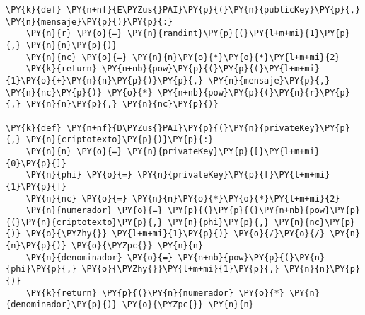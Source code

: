 
\begin{Verbatim}[commandchars=\\\{\}]
\PY{k}{def} \PY{n+nf}{E\PYZus{}PAI}\PY{p}{(}\PY{n}{publicKey}\PY{p}{,} \PY{n}{mensaje}\PY{p}{)}\PY{p}{:} 
    \PY{n}{r} \PY{o}{=} \PY{n}{randint}\PY{p}{(}\PY{l+m+mi}{1}\PY{p}{,} \PY{n}{n}\PY{p}{)} 
    \PY{n}{nc} \PY{o}{=} \PY{n}{n}\PY{o}{*}\PY{o}{*}\PY{l+m+mi}{2}
    \PY{k}{return} \PY{n+nb}{pow}\PY{p}{(}\PY{p}{(}\PY{l+m+mi}{1}\PY{o}{+}\PY{n}{n}\PY{p}{)}\PY{p}{,} \PY{n}{mensaje}\PY{p}{,} \PY{n}{nc}\PY{p}{)} \PY{o}{*} \PY{n+nb}{pow}\PY{p}{(}\PY{n}{r}\PY{p}{,} \PY{n}{n}\PY{p}{,} \PY{n}{nc}\PY{p}{)}

\PY{k}{def} \PY{n+nf}{D\PYZus{}PAI}\PY{p}{(}\PY{n}{privateKey}\PY{p}{,} \PY{n}{criptotexto}\PY{p}{)}\PY{p}{:} 
    \PY{n}{n} \PY{o}{=} \PY{n}{privateKey}\PY{p}{[}\PY{l+m+mi}{0}\PY{p}{]}
    \PY{n}{phi} \PY{o}{=} \PY{n}{privateKey}\PY{p}{[}\PY{l+m+mi}{1}\PY{p}{]}
    \PY{n}{nc} \PY{o}{=} \PY{n}{n}\PY{o}{*}\PY{o}{*}\PY{l+m+mi}{2}
    \PY{n}{numerador} \PY{o}{=} \PY{p}{(}\PY{p}{(}\PY{n+nb}{pow}\PY{p}{(}\PY{n}{criptotexto}\PY{p}{,} \PY{n}{phi}\PY{p}{,} \PY{n}{nc}\PY{p}{)} \PY{o}{\PYZhy{}} \PY{l+m+mi}{1}\PY{p}{)} \PY{o}{/}\PY{o}{/} \PY{n}{n}\PY{p}{)} \PY{o}{\PYZpc{}} \PY{n}{n}
    \PY{n}{denominador} \PY{o}{=} \PY{n+nb}{pow}\PY{p}{(}\PY{n}{phi}\PY{p}{,} \PY{o}{\PYZhy{}}\PY{l+m+mi}{1}\PY{p}{,} \PY{n}{n}\PY{p}{)}
    \PY{k}{return} \PY{p}{(}\PY{n}{numerador} \PY{o}{*} \PY{n}{denominador}\PY{p}{)} \PY{o}{\PYZpc{}} \PY{n}{n} 
\end{Verbatim}